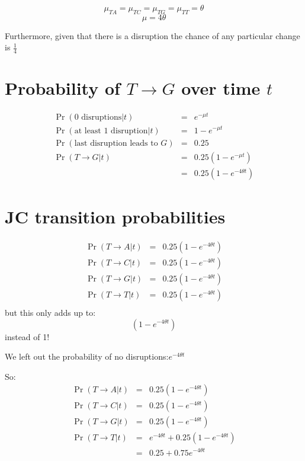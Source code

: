 \documentclass[landscape]{foils}
\newcommand{\disruption}{\theta}
\begin{document}
\[ \mu_{TA} = \mu_{TC} = \mu_{TG} = \mu_{TT} = \disruption \]
\[\mu = 4 \disruption\]

Furthermore, given that there is a disruption the chance of any particular change is
$\frac{1}{4}$

\myNewSlide
\section*{Probability of $T\rightarrow G$ over time $t$}
\begin{eqnarray*}
	\Pr(0\mbox{ disruptions} | t) &  = & e^{-\mu t} \\
	\Pr(\mbox{at least 1 disruption}| t) &  = & 1 - e^{-\mu t} \\
	\Pr(\mbox{last disruption leads to }G) &  = & 0.25 \\
	\Pr(T\rightarrow G | t) & = & 0.25\left(1 - e^{-\mu t}\right) \\
		 & = & 0.25\left(1 - e^{-4\disruption t}\right)
\end{eqnarray*}

\myNewSlide
 

\myNewSlide
\section*{JC transition probabilities}
\large
\begin{eqnarray*}
	\Pr(T\rightarrow A | t) & = & 0.25\left(1 - e^{-4\disruption t}\right) \\
	\Pr(T\rightarrow C | t) & = & 0.25\left(1 - e^{-4\disruption t}\right) \\
	\Pr(T\rightarrow G | t) & = & 0.25\left(1 - e^{-4\disruption t}\right) \\
	\Pr(T\rightarrow T | t) & = & 0.25\left(1 - e^{-4\disruption t}\right) \\
\end{eqnarray*}
but this only adds up to:
\[\left(1 - e^{-4\disruption t}\right)\]
instead of 1!

\myNewSlide
We left out the probability of no disruptions:$ e^{-4\disruption t}$

So:
\begin{eqnarray*}
	\Pr(T\rightarrow A | t) & = & 0.25\left(1 - e^{-4\disruption t}\right) \\
	\Pr(T\rightarrow C | t) & = & 0.25\left(1 - e^{-4\disruption t}\right) \\
	\Pr(T\rightarrow G | t) & = & 0.25\left(1 - e^{-4\disruption t}\right) \\
	\Pr(T\rightarrow T | t) & = & e^{-4\disruption t} + 0.25\left(1 - e^{-4\disruption t}\right) \\
		& = & 0.25 + 0.75e^{-4\disruption t} \\
\end{eqnarray*}
\end{document}

